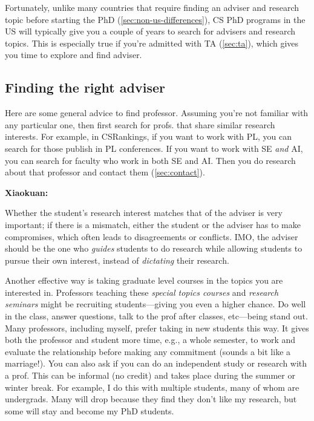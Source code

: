 \documentclass[oneside,11pt,dvipsnames]{book}
\newenvironment{commentbox}[1][]{
  \small
  \begin{mybox}
    {\small \textbf{#1}}
  }{
  \end{mybox}
}
\begin{document}
Fortunately, unlike many countries that require finding an adviser and research topic before starting the PhD (\autoref{sec:non-us-differences}), CS PhD programs in the US will typically give you a couple of years to search for advisers and research topics.  This is especially true if you're admitted with TA (\autoref{sec:ta}), which gives you time to explore and find adviser.

\subsection{Finding the right adviser}

Here are some general advice to find professor.  Assuming you're not familiar with any particular one, then first search for profs. that share similar research interests.  For example, in CSRankings, if you want to work with PL, you can search for those publish in PL conferences.  If you want to work with SE \emph{and} AI, you can search for faculty who work in both SE and AI.  Then you do research about that professor and contact them (\autoref{sec:contact}).

\begin{commentbox}[Xiaokuan:]
  Whether the student's research interest matches that of the adviser is very important;
  if there is a mismatch,
  either the student or the adviser has to make compromises,
  which often leads to disagreements or conflicts.
  IMO, the adviser should be the one who \emph{guides}  students to do research while allowing students to pursue their own interest,
  instead of \emph{dictating} their research.
\end{commentbox}


Another effective way is taking graduate level courses in the topics you are interested in.  Professors teaching these \emph{special topics courses} and \emph{research seminars} might be recruiting students---giving you even a higher chance. Do well in the class, answer questions, talk to the prof after classes, etc---being stand out.  Many professors, including myself, prefer taking in new students this way.  It gives both the professor and student more time, e.g., a whole semester, to work and evaluate the relationship before making any commitment (sounds a bit like a marriage!).
You can also ask if you can do an independent study or research with a prof. This can be informal (no credit) and takes place during the summer or winter break.  For example, I do this with multiple students, many of whom are undergrads. Many will drop because they find they don't like my research, but some will stay and become my PhD students.
\end{document}
